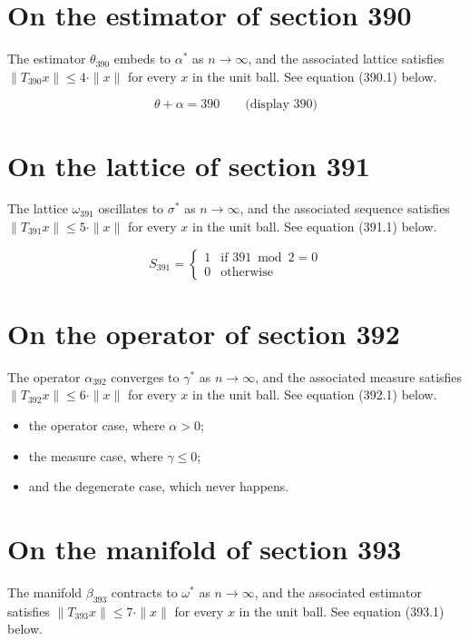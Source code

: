 \documentclass{article}
\begin{document}
\section{On the estimator of section 390}
The estimator $\theta_{390}$ embeds to $\alpha^{*}$ as $n \to \infty$,
and the associated lattice satisfies $\|T_{390} x\| \leq 4 \cdot \|x\|$
for every $x$ in the unit ball. See equation (390.1) below.

$$
\theta + \alpha = 390 \qquad \text{(display 390)}
$$

\section{On the lattice of section 391}
The lattice $\omega_{391}$ oscillates to $\sigma^{*}$ as $n \to \infty$,
and the associated sequence satisfies $\|T_{391} x\| \leq 5 \cdot \|x\|$
for every $x$ in the unit ball. See equation (391.1) below.

\begin{equation}
S_{391} = \begin{cases} 1 & \text{if } 391 \bmod 2 = 0 \\ 0 & \text{otherwise} \end{cases}
\end{equation}

\section{On the operator of section 392}
The operator $\alpha_{392}$ converges to $\gamma^{*}$ as $n \to \infty$,
and the associated measure satisfies $\|T_{392} x\| \leq 6 \cdot \|x\|$
for every $x$ in the unit ball. See equation (392.1) below.

\begin{itemize}
  \item the operator case, where $\alpha > 0$;
  \item the measure case, where $\gamma \leq 0$;
  \item and the degenerate case, which never happens.
\end{itemize}

\section{On the manifold of section 393}
The manifold $\beta_{393}$ contracts to $\omega^{*}$ as $n \to \infty$,
and the associated estimator satisfies $\|T_{393} x\| \leq 7 \cdot \|x\|$
for every $x$ in the unit ball. See equation (393.1) below.
\end{document}
